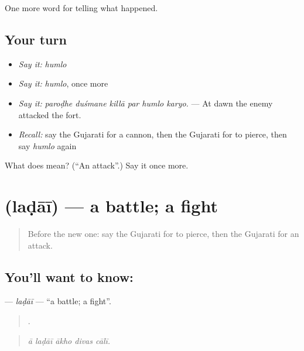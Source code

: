 \begin{grammarlens}[title={What you've built}]
One more word for telling what happened.
\end{grammarlens}

\subsection*{Your turn}
\begin{itemize}
\raggedright
  \item \emph{Say it:} \emph{humlo}
  \item \emph{Say it:} \emph{humlo}, once more
  \item \emph{Say it:} \emph{paroḍhe duśmane killā par humlo karyo.} — At dawn the enemy attacked the fort.
  \item \emph{Recall:} say the Gujarati for a cannon, then the Gujarati for to pierce, then say \emph{humlo} again
\end{itemize}

\begin{tcolorbox}[breakable,colback=teal!4,colframe=teal!35!black,title={Before you move on}]
What does  mean? (\textquotedblleft{}An attack\textquotedblright{}.) Say it once more.
\end{tcolorbox}
\section[\texorpdfstring{\gu{લડાઈ} (laḍāī)}{લડાઈ (laḍāī)}]{ (laḍāī) — a battle; a fight}

\label{lesson:GU-C322-ladai}



\begin{quote}
Before the new one: say the Gujarati for to pierce, then the Gujarati for an attack.
\end{quote}

\subsection*{You'll want to know: }
\textbf{} — \emph{laḍāī} — \textquotedblleft{}a battle; a fight\textquotedblright{}.

\begin{quote}
    .
\end{quote}

\begin{quote}
\emph{ā laḍāī ākho divas cālī.}
\end{quote}

